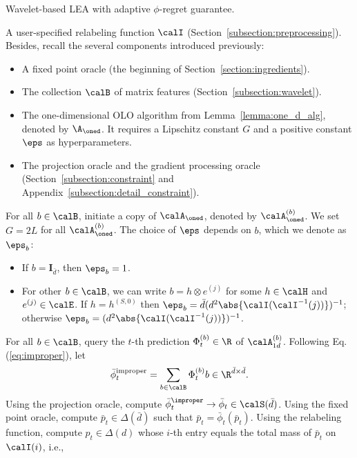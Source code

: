 \documentclass[10pt]{article}
\begin{document}
\begin{algorithm*}[!ht]
\caption{Wavelet-based LEA with adaptive $\phi$-regret guarantee.\label{algorithm:main}}
\begin{algorithmic}[1]
\REQUIRE A user-specified relabeling function $\calI$ (Section~\ref{subsection:preprocessing}). Besides, recall the several components introduced previously: 
\begin{itemize}[leftmargin=*,itemsep=0pt,topsep=5pt]
\item A fixed point oracle (the beginning of Section~\ref{section:ingredients}). 
\item The collection $\calB$ of matrix features (Section~\ref{subsection:wavelet}).
\item The one-dimensional OLO algorithm from Lemma~\ref{lemma:one_d_alg}, denoted by $\A_\oned$. It requires a Lipschitz constant $G$ and a positive constant $\eps$ as hyperparameters. 
\item The projection oracle and the gradient processing oracle (Section~\ref{subsection:constraint} and Appendix~\ref{subsection:detail_constraint}).
\end{itemize}
\STATE For all $b\in\calB$, initiate a copy of $\calA_{\oned}$, denoted by $\calA_{\oned}^{(b)}$. We set $G=2L$ for all $\calA_{\oned}^{(b)}$. The choice of $\eps$ depends on $b$, which we denote as $\eps_b$: 
\begin{itemize}
\item If $b=\bm{I}_{\bar d}$, then $\eps_b=1$.
\item For other $b\in\calB$, we can write $b=h\otimes e^{(j)}$ for some $h\in\calH$ and $e^{(j)}\in\calE$. If $h=h^{(S,0)}$ then $\eps_b=\bar d(d^2\abs{\calI(\calI^{-1}(j))})^{-1}$; otherwise $\eps_b=(d^2\abs{\calI(\calI^{-1}(j))})^{-1}$. 
\end{itemize}
\STATE For all $b\in\calB$, query the $t$-th prediction $\Phi^{(b)}_t\in\R$ of $\calA_{1d}^{(b)}$. 
\STATE Following Eq.(\ref{eq:improper}), let
\begin{equation*}
\bar\phi_t^{\mathrm{improper}}=\sum_{b\in\calB}\Phi_t^{(b)}b\in\R^{\bar d\times\bar d}.
\end{equation*}
\STATE Using the projection oracle, compute $\bar \phi^\improper_t\rightarrow \bar \phi_t\in\calS(\bar d)$. 
\STATE Using the fixed point oracle, compute $\bar p_t\in\Delta(\bar d)$ such that $\bar p_t=\bar\phi_t(\bar p_t)$.
\STATE Using the relabeling function, compute $p_t\in\Delta(d)$ whose $i$-th entry equals the total mass of $\bar p_t$ on $\calI(i)$, i.e.,

\end{algorithmic}
\end{algorithm*}
\end{document}

